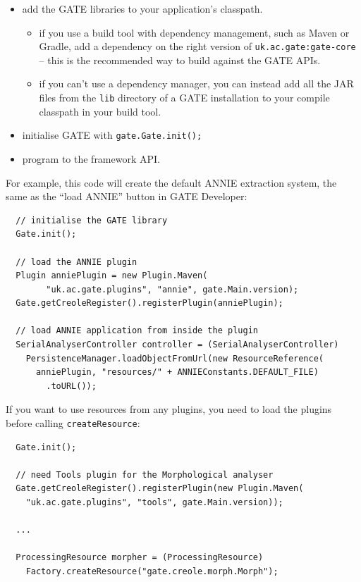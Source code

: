 \begin{flushleft}
\sloppy
\begin{itemize}
\item add the GATE libraries to your application's classpath.
  \begin{itemize}
  \item if you use a build tool with dependency management, such
    as Maven or Gradle, add a dependency on the right version of
    \texttt{uk.ac.gate:gate-core} -- this is the recommended way
    to build against the GATE APIs.
  \item if you can't use a dependency manager, you can instead add
    all the JAR files from the \texttt{lib} directory of a GATE
    installation to your compile classpath in your build tool.
  \end{itemize}
\item initialise GATE with \texttt{gate.Gate.init();}
\item program to the framework API.
\end{itemize}
\fussy
\end{flushleft}
%
For example, this code will create the default ANNIE extraction system,
the same as the ``load ANNIE'' button in GATE Developer:
%
\begin{lstlisting}
  // initialise the GATE library
  Gate.init();

  // load the ANNIE plugin
  Plugin anniePlugin = new Plugin.Maven(
        "uk.ac.gate.plugins", "annie", gate.Main.version);
  Gate.getCreoleRegister().registerPlugin(anniePlugin);

  // load ANNIE application from inside the plugin
  SerialAnalyserController controller = (SerialAnalyserController)
    PersistenceManager.loadObjectFromUrl(new ResourceReference(
      anniePlugin, "resources/" + ANNIEConstants.DEFAULT_FILE)
        .toURL());
\end{lstlisting}
%
If you want to use resources from any plugins, you need to
load the plugins before calling \verb|createResource|:
\begin{lstlisting}
  Gate.init();

  // need Tools plugin for the Morphological analyser
  Gate.getCreoleRegister().registerPlugin(new Plugin.Maven(
    "uk.ac.gate.plugins", "tools", gate.Main.version));

  ...

  ProcessingResource morpher = (ProcessingResource)
    Factory.createResource("gate.creole.morph.Morph");
\end{lstlisting}
